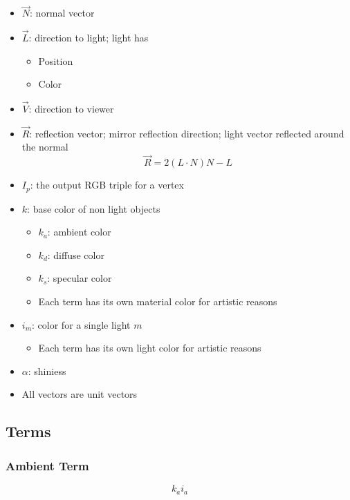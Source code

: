 \begin{itemize}
  \item $ \vec{N} $: normal vector
  \item $ \vec{L} $: direction to light; light has
  \begin{itemize}
    \item Position
    \item Color
  \end{itemize}
  \item $ \vec{V} $: direction to viewer
  \item $ \vec{R} $: reflection vector; mirror reflection direction; light
  vector reflected around the normal
  \begin{equation}
    \vec{R} = 2 \left( L \cdot N \right) N - L
  \end{equation}
  \item $ I_{p} $: the output RGB triple for a vertex
  \item $ k $: base color of non light objects
  \begin{itemize}
    \item $ k_{a} $: ambient color
    \item $ k_{d} $: diffuse color
    \item $ k_{s} $: specular color
    \item Each term has its own material color for artistic reasons
  \end{itemize}

  \item $ i_{m} $: color for a single light $ m $
  \begin{itemize}
    \item Each term has its own light color for artistic reasons
  \end{itemize}

  \item $ \alpha $: shiniess
  \item All vectors are unit vectors
\end{itemize}

\subsection{Terms}

  \subsubsection{Ambient Term}

    \begin{equation}
      k_{a} i_{a}
    \end{equation}

